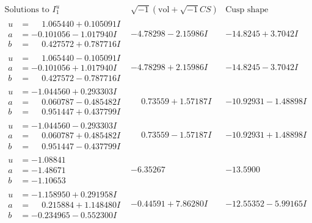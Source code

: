 \documentclass[1p]{elsarticle_modified}
\theoremstyle{definition}
\newcommand{\I}{\sqrt{-1}}
\begin{document}
$$\begin{array}{c|c|c}  
\text{Solutions to }I^u_{1}& \I (\text{vol} + \sqrt{-1}CS) & \text{Cusp shape}\\
 \hline 
\begin{aligned}
u &= \phantom{-}1.065440 + 0.105091 I \\
a &= -0.101056 - 1.017940 I \\
b &= \phantom{-}0.427572 + 0.787716 I\end{aligned}
 & -4.78298 - 2.15986 I & -14.8245 + 3.7042 I \\ \hline\begin{aligned}
u &= \phantom{-}1.065440 - 0.105091 I \\
a &= -0.101056 + 1.017940 I \\
b &= \phantom{-}0.427572 - 0.787716 I\end{aligned}
 & -4.78298 + 2.15986 I & -14.8245 - 3.7042 I \\ \hline\begin{aligned}
u &= -1.044560 + 0.293303 I \\
a &= \phantom{-}0.060787 - 0.485482 I \\
b &= \phantom{-}0.951447 + 0.437799 I\end{aligned}
 & \phantom{-}0.73559 + 1.57187 I & -10.92931 - 1.48898 I \\ \hline\begin{aligned}
u &= -1.044560 - 0.293303 I \\
a &= \phantom{-}0.060787 + 0.485482 I \\
b &= \phantom{-}0.951447 - 0.437799 I\end{aligned}
 & \phantom{-}0.73559 - 1.57187 I & -10.92931 + 1.48898 I \\ \hline\begin{aligned}
u &= -1.08841\phantom{ +0.000000I} \\
a &= -1.48671\phantom{ +0.000000I} \\
b &= -1.10653\phantom{ +0.000000I}\end{aligned}
 & -6.35267\phantom{ +0.000000I} & -13.5900\phantom{ +0.000000I} \\ \hline\begin{aligned}
u &= -1.158950 + 0.291958 I \\
a &= \phantom{-}0.215884 + 1.148480 I \\
b &= -0.234965 - 0.552300 I\end{aligned}
 & -0.44591 + 7.86280 I & -12.55352 - 5.99165 I \\ \hline\begin{aligned}

\end{aligned}
\end{array}$$
\end{document}
